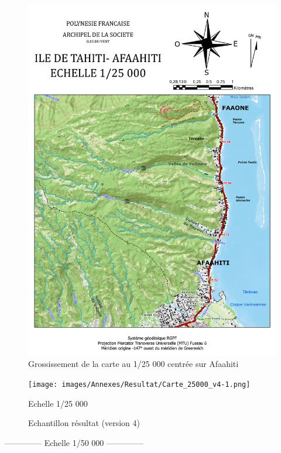 \documentclass{themeensg}
\begin{document}
\begin{appendices}
\begin{figure}[!h]
\centering
\includegraphics[width=\linewidth]{images/Annexes/Resultat/Carte_25000_A4.pdf}
\caption{Grossissement de la carte au 1/25 000 centrée sur Afaahiti}
\label{15000_gros}
\end{figure}

\begin{figure}
\centering
\texttt{[image: images/Annexes/Resultat/Carte\_25000\_v4-1.png]}%
\caption{Echantillon résultat (version 4) }
\colorbox{green!10}{Echelle 1/25 000}
\label{15000 v2}%
\end{figure}

\clearpage
\begin{center}
    \Large
    \colorbox{yellow!10}{--------------\- Echelle 1/50 000 --------------\-}
\end{center}


\end{appendices}
\end{document}
